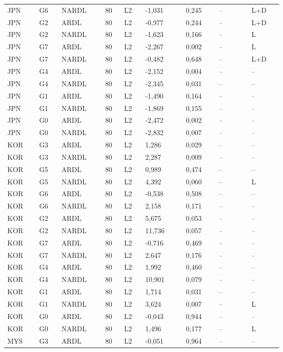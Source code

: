 {\begin{longtable}{p{0.075\linewidth}p{0.05\linewidth}p{0.09\linewidth}p{0.04\linewidth}p{0.05\linewidth}p{0.1\linewidth}p{0.085\linewidth}p{0.085\linewidth}p{0.075\linewidth}}
JPN & G6 & NARDL & 80 & L2 & -1,031 & 0,245 & -- & L+D\\
JPN & G2 & ARDL & 80 & L2 & -0,977 & 0,244 & -- & L+D\\
JPN & G2 & NARDL & 80 & L2 & -1,623 & 0,166 & -- & L\\
JPN & G7 & ARDL & 80 & L2 & -2,267 & 0,002 & -- & L\\
JPN & G7 & NARDL & 80 & L2 & -0,482 & 0,648 & -- & L+D\\
JPN & G4 & ARDL & 80 & L2 & -2,152 & 0,004 & -- & --\\
JPN & G4 & NARDL & 80 & L2 & -2,345 & 0,031 & -- & --\\
JPN & G1 & ARDL & 80 & L2 & -1,490 & 0,164 & -- & --\\
JPN & G1 & NARDL & 80 & L2 & -1,869 & 0,155 & -- & --\\
JPN & G0 & ARDL & 80 & L2 & -2,472 & 0,002 & -- & --\\
JPN & G0 & NARDL & 80 & L2 & -2,832 & 0,007 & -- & --\\
KOR & G3 & ARDL & 80 & L2 & 1,286 & 0,029 & -- & --\\
KOR & G3 & NARDL & 80 & L2 & 2,287 & 0,009 & -- & --\\
KOR & G5 & ARDL & 80 & L2 & 0,989 & 0,474 & -- & --\\
KOR & G5 & NARDL & 80 & L2 & 4,392 & 0,060 & -- & L\\
KOR & G6 & ARDL & 80 & L2 & -0,538 & 0,508 & -- & --\\
KOR & G6 & NARDL & 80 & L2 & 2,158 & 0,171 & -- & --\\
KOR & G2 & ARDL & 80 & L2 & 5,675 & 0,053 & -- & --\\
KOR & G2 & NARDL & 80 & L2 & 11,736 & 0,057 & -- & --\\
KOR & G7 & ARDL & 80 & L2 & -0,716 & 0,469 & -- & --\\
KOR & G7 & NARDL & 80 & L2 & 2,647 & 0,176 & -- & --\\
KOR & G4 & ARDL & 80 & L2 & 1,992 & 0,460 & -- & --\\
KOR & G4 & NARDL & 80 & L2 & 10,901 & 0,079 & -- & --\\
KOR & G1 & ARDL & 80 & L2 & 1,714 & 0,031 & -- & --\\
KOR & G1 & NARDL & 80 & L2 & 3,624 & 0,007 & -- & L\\
KOR & G0 & ARDL & 80 & L2 & -0,043 & 0,944 & -- & --\\
KOR & G0 & NARDL & 80 & L2 & 1,496 & 0,177 & -- & L\\
MYS & G3 & ARDL & 80 & L2 & -0,051 & 0,964 & -- & --\\

\end{longtable}}

